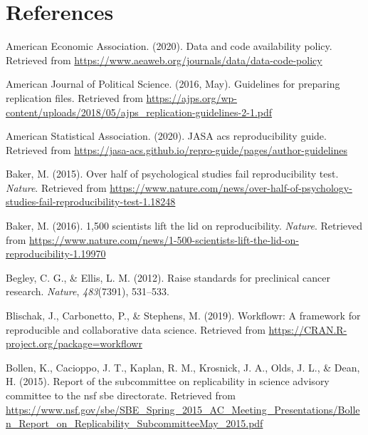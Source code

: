 \documentclass[12pt,twoside]{reedthesis}
\begin{document}
\backmatter

\chapter*{References}\label{references}


\noindent

\setlength{\parindent}{-0.20in} \setlength{\leftskip}{0.20in}
\setlength{\parskip}{8pt}

\hypertarget{refs}{}
\hypertarget{ref-aee-policy}{}
American Economic Association. (2020). Data and code availability
policy. Retrieved from
\url{https://www.aeaweb.org/journals/data/data-code-policy}

\hypertarget{ref-ajps-guidelines}{}
American Journal of Political Science. (2016, May). Guidelines for
preparing replication files. Retrieved from
\url{https://ajps.org/wp-content/uploads/2018/05/ajps_replication-guidelines-2-1.pdf}

\hypertarget{ref-asa-guide}{}
American Statistical Association. (2020). JASA acs reproducibility
guide. Retrieved from
\url{https://jasa-acs.github.io/repro-guide/pages/author-guidelines}

\hypertarget{ref-nature-psych}{}
Baker, M. (2015). Over half of psychological studies fail
reproducibility test. \emph{Nature}. Retrieved from
\url{https://www.nature.com/news/over-half-of-psychology-studies-fail-reproducibility-test-1.18248}

\hypertarget{ref-nature-crisis}{}
Baker, M. (2016). 1,500 scientists lift the lid on reproducibility.
\emph{Nature}. Retrieved from
\url{https://www.nature.com/news/1-500-scientists-lift-the-lid-on-reproducibility-1.19970}

\hypertarget{ref-begley2012raise}{}
Begley, C. G., \& Ellis, L. M. (2012). Raise standards for preclinical
cancer research. \emph{Nature}, \emph{483}(7391), 531--533.

\hypertarget{ref-R-workflowr}{}
Blischak, J., Carbonetto, P., \& Stephens, M. (2019). Workflowr: A
framework for reproducible and collaborative data science. Retrieved
from \url{https://CRAN.R-project.org/package=workflowr}

\hypertarget{ref-arlington}{}
Bollen, K., Cacioppo, J. T., Kaplan, R. M., Krosnick, J. A., Olds, J.
L., \& Dean, H. (2015). Report of the subcommittee on replicability in
science advisory committee to the nsf sbe directorate. Retrieved from
\url{https://www.nsf.gov/sbe/SBE_Spring_2015_AC_Meeting_Presentations/Bollen_Report_on_Replicability_SubcommitteeMay_2015.pdf}
\end{document}
